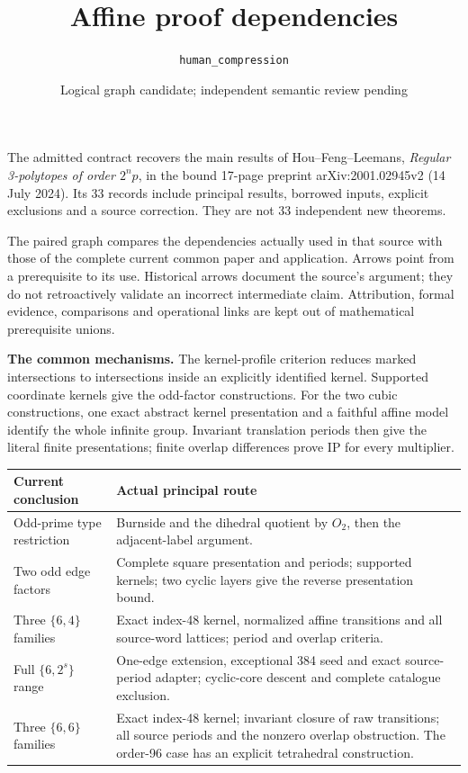 \documentclass[11pt]{article}
\title{Affine proof dependencies}
\author{\texttt{human\_compression}}
\date{Logical graph candidate; independent semantic review pending}
\begin{document}
\maketitle
\vspace{-1.2em}

The admitted contract recovers the main results of Hou--Feng--Leemans,
\emph{Regular 3-polytopes of order $2^np$}, in the bound 17-page preprint
arXiv:2001.02945v2 (14 July 2024). Its 33 records include principal results,
borrowed inputs, explicit exclusions and a source correction. They are not
33 independent new theorems.

The paired graph compares the dependencies actually used in that source
with those of the complete current common paper and application. Arrows point
from a prerequisite to its use. Historical arrows document the source's
argument; they do not retroactively validate an incorrect intermediate claim.
Attribution, formal evidence, comparisons and operational links are kept out
of mathematical prerequisite unions.

\textbf{The common mechanisms.}
The kernel-profile criterion reduces marked intersections to intersections
inside an explicitly identified kernel. Supported coordinate kernels give
the odd-factor constructions. For the two cubic constructions, one exact
abstract kernel presentation and a faithful affine model identify the whole
infinite group. Invariant translation periods then give the literal finite
presentations; finite overlap differences prove IP for every multiplier.

\begin{tabular}{@{}>{\raggedright\arraybackslash}p{.25\linewidth}>{\raggedright\arraybackslash}p{.69\linewidth}@{}}
\toprule
Current conclusion & Actual principal route \\
\midrule
Odd-prime type restriction & Burnside and the dihedral quotient by $O_2$, then the adjacent-label argument. \\
Two odd edge factors & Complete square presentation and periods; supported kernels; two cyclic layers give the reverse presentation bound. \\
Three $\{6,4\}$ families & Exact index-48 kernel, normalized affine transitions and all source-word lattices; period and overlap criteria. \\
Full $\{6,2^s\}$ range & One-edge extension, exceptional 384 seed and exact source-period adapter; cyclic-core descent and complete catalogue exclusion. \\
Three $\{6,6\}$ families & Exact index-48 kernel; invariant closure of raw transitions; all source periods and the nonzero overlap obstruction. The order-96 case has an explicit tetrahedral construction. \\
\bottomrule
\end{tabular}
\end{document}
